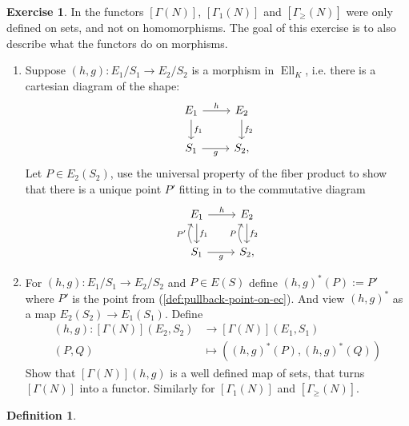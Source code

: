 \documentclass[a4paper,12pt,reqno]{amsart}
\makeatletter
\renewcommand{\listoftodos}[1][\@todonotes@todolistname]{%
	\@starttoc{tdo}{#1}}
\DeclareMathOperator{\Ell}{Ell}
\theoremstyle{definition}
\newtheorem{definition}[lemma]{Definition}
\newtheorem{exercise}[lemma]{Exercise}
\numberwithin{lemma}{section}
\numberwithin{equation}{section}
\numberwithin{figure}{section}
\makeatother
\begin{document}
\begin{exercise}
In  the functors $[\Gamma(N)]$, $[\Gamma_1(N)]$ and $[\Gamma_\geq(N)]$ were only defined on sets, and not on homomorphisms.  The goal of this exercise is to also describe what the functors do on morphisms.
\begin{enumerate}
\item Suppose $(h,g): E_1/S_1 \to E_2/S_2$ is a morphism in $\Ell_K$, i.e. there is a cartesian diagram of the shape:
	\[
\begin{tikzcd}
E_1 \arrow[r,"h"] \arrow[d,"f_1"] & E_2 \arrow[d, "f_2"] \\
S_1 \arrow[r, "g"'] & S_2,
\end{tikzcd}
\]
Let $P \in E_2(S_2)$, use the universal property of the fiber product to show that there is a unique point $P'$ fitting in to the commutative diagram
	\[
\begin{tikzcd}
E_1 \arrow[r,"h"] \arrow[d,"f_1"] & E_2 \arrow[d, "f_2"] \\
S_1  \arrow[u, bend left,"P'"] \arrow[r, "g"'] & S_2 \arrow[u, bend left, "P"], \label{def:pullback-point-on-ec}
\end{tikzcd}
\]
\item For $(h,g): E_1/S_1 \to E_2/S_2$  and $P\in E(S)$ define  $(h,g)^*(P) := P'$ where $P'$ is the point from (\ref{def:pullback-point-on-ec}). And view $(h,g)^*$ as a map $E_2(S_2) \to E_1(S_1)$. Define 
\begin{align*}
[\Gamma(N)](h,g) : [\Gamma(N)](E_2,S_2) &\to [\Gamma(N)](E_1,S_1) \\
 (P,Q) &\mapsto ((h,g)^*(P),(h,g)^*(Q) )
\end{align*}
Show that $[\Gamma(N)](h,g)$ is a well defined map of sets, that turns $[\Gamma(N)]$ into a functor. Similarly for $[\Gamma_1(N)]$ and $[\Gamma_\geq(N)]$.
\end{enumerate}
\end{exercise}

\begin{definition}

\end{definition}
\listoftodos


{}
\end{document}
